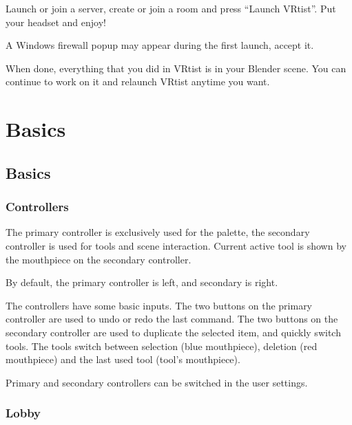 \documentclass[letterpaper,10pt,english,openany,oneside]{sphinxmanual}
\let\sphinxpxdimen\pdfpxdimen\else\newdimen\sphinxpxdimen
\begin{document}
\sphinxAtStartPar
Launch or join a server, create or join a room and press “Launch VRtist”. Put your headset and enjoy!

\sphinxAtStartPar
A Windows firewall popup may appear during the first launch, accept it.

\sphinxAtStartPar
When done, everything that you did in VRtist is in your Blender scene. You can continue to work on it and relaunch VRtist anytime you want.


\chapter{Basics}
\label{\detokenize{index:basics}}

\section{Basics}
\label{\detokenize{Basics/Basics:basics}}\label{\detokenize{Basics/Basics::doc}}

\subsection{Controllers}
\label{\detokenize{Basics/Basics:controllers}}
\sphinxAtStartPar
The primary controller is exclusively used for the palette, the secondary controller is used for tools and scene interaction. Current active tool is shown by the mouthpiece on the secondary controller.

\sphinxAtStartPar
By default, the primary controller is left, and secondary is right.

\sphinxAtStartPar
The controllers have some basic inputs.
The two buttons on the primary controller are used to undo or redo the last command.
The two buttons on the secondary controller are used to duplicate the selected item, and quickly switch tools. The tools switch between selection (blue mouthpiece), deletion (red mouthpiece) and the last used tool (tool’s mouthpiece).

\sphinxAtStartPar
Primary and secondary controllers can be switched in the user settings.


\subsection{Lobby}
\label{\detokenize{Basics/Basics:lobby}}
\noindent{\hspace*{\fill}\sphinxincludegraphics[width=300\sphinxpxdimen]{{Lobby}.png}\hspace*{\fill}}
\end{document}
